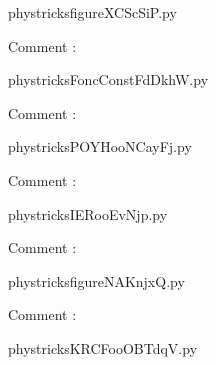     \newcommand{\CaptionFigfigureXCScSiP}{<+Type your caption here+>}
    \begin{center}
        
    \end{center}
    phystricksfigureXCScSiP.py

    Comment : 

    \clearpage
    


    \newcommand{\CaptionFigFoncConstFdDkhW}{<+Type your caption here+>}
    \begin{center}
        
    \end{center}
    phystricksFoncConstFdDkhW.py

    Comment : 

    \clearpage
    


    \newcommand{\CaptionFigPOYHooNCayFj}{<+Type your caption here+>}
    \begin{center}
        
    \end{center}
    phystricksPOYHooNCayFj.py

    Comment : 

    \clearpage
    


    \newcommand{\CaptionFigIERooEvNjp}{<+Type your caption here+>}
    \begin{center}
        
    \end{center}
    phystricksIERooEvNjp.py

    Comment : 

    \clearpage
    


    \newcommand{\CaptionFigfigureNAKnjxQ}{<+Type your caption here+>}
    \begin{center}
        
    \end{center}
    phystricksfigureNAKnjxQ.py

    Comment : 

    \clearpage
    


    \newcommand{\CaptionFigKRCFooOBTdqV}{<+Type your caption here+>}
    \begin{center}
        
    \end{center}
    phystricksKRCFooOBTdqV.py

